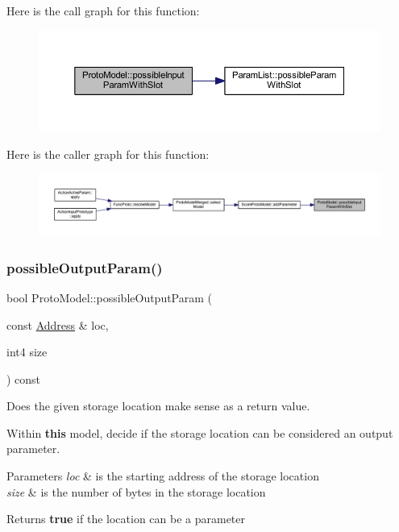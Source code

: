 Here is the call graph for this function\+:
\nopagebreak
\begin{figure}[H]
\begin{center}
\leavevmode
\includegraphics[width=350pt]{class_proto_model_a6577cdf023ed6a660ba804e43e356b4e_cgraph}
\end{center}
\end{figure}
Here is the caller graph for this function\+:
\nopagebreak
\begin{figure}[H]
\begin{center}
\leavevmode
\includegraphics[width=350pt]{class_proto_model_a6577cdf023ed6a660ba804e43e356b4e_icgraph}
\end{center}
\end{figure}
\mbox{\label{class_proto_model_aea2696911b81cc71cc68d927d7c02204}} 
\subsubsection{\texorpdfstring{possibleOutputParam()}{possibleOutputParam()}}
{\footnotesize\ttfamily bool Proto\+Model\+::possible\+Output\+Param (\begin{DoxyParamCaption}\item[{const \mbox{\hyperlink{class_address}{Address}} \&}]{loc,  }\item[{int4}]{size }\end{DoxyParamCaption}) const\hspace{0.3cm}{\ttfamily [inline]}}



Does the given storage location make sense as a return value. 

Within {\bfseries{this}} model, decide if the storage location can be considered an output parameter. 
\begin{DoxyParams}{Parameters}
{\em loc} & is the starting address of the storage location \\
\hline
{\em size} & is the number of bytes in the storage location \\
\hline
\end{DoxyParams}
\begin{DoxyReturn}{Returns}
{\bfseries{true}} if the location can be a parameter 
\end{DoxyReturn}


